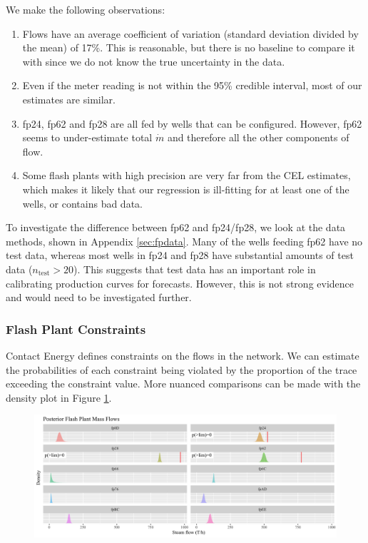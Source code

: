 \documentclass[a4paper, 12pt]{article}
\begin{document}
We make the following observations:

\begin{enumerate}
\item Flows have an average coefficient of variation (standard deviation divided by the mean) of 17\%. This is reasonable, but there is no baseline to compare it with since we do not know the true uncertainty in the data.
\item Even if the meter reading is not within the 95\% credible interval, most of our estimates are similar.
\item fp24, fp62 and fp28 are all fed by wells that can be configured. However, fp62 seems to under-estimate total $\dot{m}$ and therefore all the other components of flow.
\item Some flash plants with high precision are very far from the CEL estimates, which makes it likely that our regression is ill-fitting for at least one of the wells, or contains bad data.
\end{enumerate}

To investigate the difference between fp62 and fp24/fp28, we look at the data methods, shown in Appendix \ref{sec:fpdata}. Many of the wells feeding fp62 have no test data, whereas most wells in fp24 and fp28 have substantial amounts of test data ($n_\text{test} > 20$). This suggests that test data has an important role in calibrating production curves for forecasts. However, this is not strong evidence and would need to be investigated further.

\subsubsection{Flash Plant Constraints}
Contact Energy defines constraints on the flows in the network. We can estimate the probabilities of each constraint being violated by the proportion of the trace exceeding the constraint value. More nuanced comparisons can be made with the density plot in Figure \ref{fig:constraints}.

\begin{figure}
\centering
  \includegraphics[width=\linewidth]{media/constraints}
  \label{fig:constraints}
\end{figure}
\end{document}
